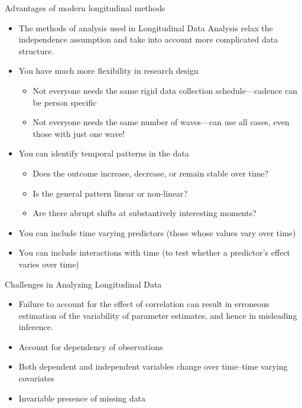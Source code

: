 \documentclass{beamer}
\begin{document}
\begin{frame}{Advantages of modern longitudinal methods}
\begin{itemize}
	\item The methods of analysis used in Longitudinal Data Analysis relax the independence assumption and take into account more complicated data structure.
	\item You have much more flexibility in research design
	\begin{itemize}
		\item Not everyone needs the same rigid data collection schedule—cadence can be person specific
		\item Not everyone needs the same number of waves—can use all cases, even those with just one wave! 
	\end{itemize}
	\item You can identify temporal patterns in the data
	\begin{itemize}
		\item Does the outcome increase, decrease, or remain stable over time?
		\item Is the general pattern linear or non-linear?
		\item Are there abrupt shifts at substantively interesting moments?
	\end{itemize}
	\item You can include time varying predictors (those whose values vary over time)
	\item You can include interactions with time (to test whether a predictor’s effect varies over time) 
\end{itemize}
\end{frame}


\begin{frame}{Challenges in Analyzing Longitudinal Data}
\begin{itemize}
	\item Failure to account for the effect of correlation can result in erroneous estimation of the variability of parameter estimates, 	and hence in misleading inference.
	\item Account for dependency of observations
	\item Both dependent and independent variables change over time–time varying covariates
	\item Invariable presence of missing data
\end{itemize}
\end{frame}
\end{document}
